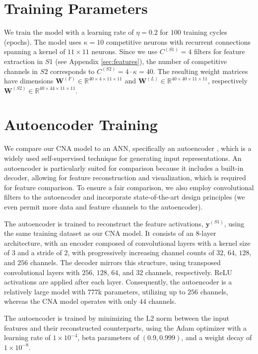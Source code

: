 \documentclass[12pt]{article}
\begin{document}
\section{Training Parameters}\label{sec:parameters}
We train the model with a learning rate of $\eta=0.2$ for $100$ training cycles (epochs). The model uses $\kappa=10$ competitive neurons with recurrent connections spanning a kernel of $11 \times 11$ neurons.
Since we use $C^{(S1)}=4$ filters for feature extraction in $S1$ (see Appendix \ref{sec:features}), the number of competitive channels in $S2$ corresponds to $C^{(S2)} = 4 \cdot \kappa = 40$.
The resulting weight matrices have dimensions $\boldsymbol{W}^{(F)} \in \mathbb{R}^{40 \times 4 \times 11 \times 11}$ and $\boldsymbol{W}^{(L)} \in \mathbb{R}^{40 \times 40 \times 11 \times 11}$, respectively $\boldsymbol{W}^{(S2)} \in \mathbb{R}^{40 \times 44 \times 11 \times 11}$.


\section{Autoencoder Training}\label{sec:autoencoder_params}
We compare our CNA model to an ANN, specifically an autoencoder \citep{Hinton2006}, which is a widely used self-supervised technique for generating input representations. An autoencoder is particularly suited for comparison because it includes a built-in decoder, allowing for feature reconstruction and visualization, which is required for feature comparison. To ensure a fair comparison, we also employ convolutional filters \citep{lecun_backpropagation_1989} to the autoencoder and incorporate state-of-the-art design principles (we even permit more data and feature channels to the autoencoder).

The autoencoder is trained to reconstruct the feature activations, $\boldsymbol{y}^{(S1)}$, using the same training dataset as our CNA model. It consists of an 8-layer architecture, with an encoder composed of convolutional layers with a kernel size of $3$ and a stride of $2$, with progressively increasing channel counts of $32$, $64$, $128$, and $256$ channels. The decoder mirrors this structure, using transposed convolutional layers with $256$, $128$, $64$, and $32$ channels, respectively. ReLU activations are applied after each layer. Consequently, the autoencoder is a relatively large model with $777$k parameters, utilizing up to $256$ channels, whereas the CNA model operates with only $44$ channels.

The autoencoder is trained by minimizing the L2 norm between the input features and their reconstructed counterparts, using the Adam optimizer \citep{Kingma_Ba_2015} with a learning rate of $1 \times 10^{-4}$, beta parameters of $(0.9, 0.999)$, and a weight decay of $1 \times 10^{-8}$.
\end{document}
